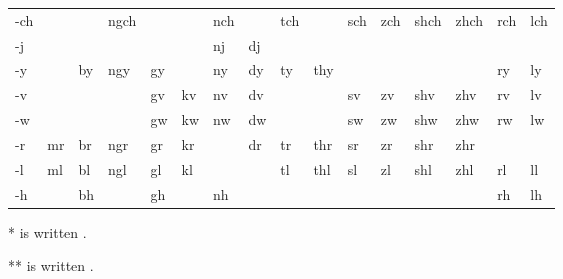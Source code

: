 \begin{table}[H]
\begin{tabular}{ l|l|l|l|l|l|l|l|l|l|l|l|l|l|l|l }
	-ch &      &      & ngch &      &      & nch  &      & tch  &      & sch  & zch  & shch & zhch & rch  & lch  \\
	-j  &      &      &      &      &      & nj   & dj   &      &      &      &      &      &      &      &      \\
	-y  &      & by   & ngy  & gy   &      & ny   & dy   & ty   & thy  &      &      &      &      & ry   & ly   \\
	-v  &      &      &      & gv   & kv   & nv   & dv   &      &      & sv   & zv   & shv  & zhv  & rv   & lv   \\
	-w  &      &      &      & gw   & kw   & nw   & dw   &      &      & sw   & zw   & shw  & zhw  & rw   & lw   \\
	-r  & mr   & br   & ngr  & gr   & kr   &      & dr   & tr   & thr  & sr   & zr   & shr  & zhr  &      &      \\
	-l  & ml   & bl   & ngl  & gl   & kl   &      &      & tl   & thl  & sl   & zl   & shl  & zhl  & rl   & ll   \\
	-h  &      & bh   &      & gh   &      & nh   &      &      &      &      &      &      &      & rh   & lh   \\
\end{tabular}
\end{table}

*  is written .

**  is written .
